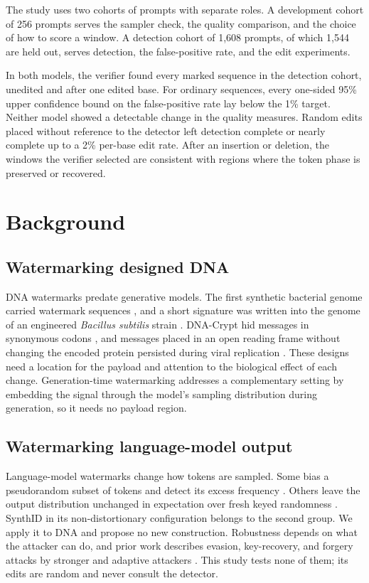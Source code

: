 \documentclass[10pt,twocolumn]{article}
\begin{document}
The study uses two cohorts of prompts with separate roles. A development cohort of 256 prompts
serves the sampler check, the quality comparison, and the choice of how to score a window. A
detection cohort of 1{,}608 prompts, of which 1{,}544 are held out, serves detection, the
false-positive rate, and the edit experiments.

In both models, the verifier found every marked sequence in the detection cohort, unedited and after
one edited base. For ordinary sequences, every one-sided 95\% upper confidence bound on the
false-positive rate lay below the 1\% target. Neither model showed a detectable change in the
quality measures. Random edits placed without reference to the detector left detection complete or
nearly complete up to a 2\% per-base edit rate. After an insertion or deletion, the windows the
verifier selected are consistent with regions where the token phase is preserved or recovered.

\section{Background}
\label{sec:background}

\subsection{Watermarking designed DNA}

DNA watermarks predate generative models. The first synthetic bacterial genome carried watermark
sequences \cite{gibson2010creation}, and a short signature was written into the genome of an
engineered \textit{Bacillus subtilis} strain \cite{arita2004secret}. DNA-Crypt hid messages in
synonymous codons \cite{heider2007dna}, and messages placed in an open reading frame without
changing the encoded protein persisted during viral replication \cite{liss2012watermarks}. These
designs need a location for the payload and attention to the biological effect of each change. Generation-time
watermarking addresses a complementary setting by embedding the signal through the model's
sampling distribution during generation, so it needs no payload region.

\subsection{Watermarking language-model output}

Language-model watermarks change how tokens are sampled. Some bias a pseudorandom subset of tokens
and detect its excess frequency \cite{kirchenbauer2023watermark}. Others leave the output
distribution unchanged in expectation over fresh keyed randomness
\cite{christ2024undetectable,kuditipudi2024robust,aaronson2022watermark,hu2024unbiased,wu2024dipmark}.
SynthID in its non-distortionary configuration belongs to the second group. We apply it to DNA and
propose no new construction. Robustness depends on what the attacker can do, and prior work
describes evasion, key-recovery, and forgery attacks by stronger and adaptive attackers
\cite{zhang2024sand,diaa2025adaptive,sadasivan2025reliably,jovanovic2024stealing,reynolds2025breaking}.
This study tests none of them; its edits are random and never consult the detector.
\end{document}
